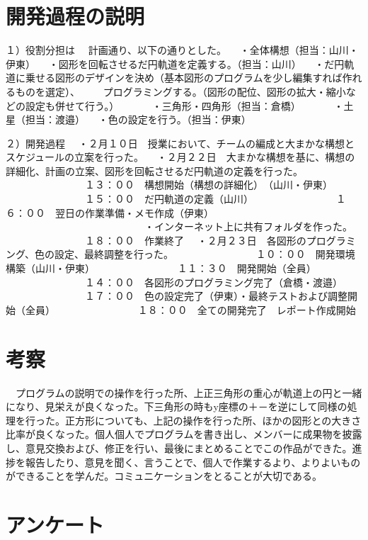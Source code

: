 \documentclass[12pt,a4j]{jarticle}
\begin{document}
\section{開発過程の説明}
\begin{itemize}
１）役割分担は
　計画通り、以下の通りとした。
　・全体構想（担当：山川・伊東）
　・図形を回転させるだ円軌道を定義する。（担当：山川）
　・だ円軌道に乗せる図形のデザインを決め（基本図形のプログラムを少し編集すれば作れるものを選定）、
　　プログラミングする。（図形の配位、図形の拡大・縮小などの設定も併せて行う。）
　　　・三角形・四角形（担当：倉橋）
　　　・土星（担当：渡邉）
　・色の設定を行う。（担当：伊東）

２）開発過程
　・２月１０日　授業において、チームの編成と大まかな構想とスケジュールの立案を行った。
　・２月２２日　大まかな構想を基に、構想の詳細化、計画の立案、図形を回転させるだ円軌道の定義を行った。
　　　　　　　　１３：００　構想開始（構想の詳細化）　（山川・伊東）
　　　　　　　　１５：００　だ円軌道の定義（山川）
　　　　　　　　１６：００　翌日の作業準備・メモ作成（伊東）
　　　　　　　　　　　　　　・インターネット上に共有フォルダを作った。
　　　　　　　　１８：００　作業終了
　・２月２３日　各図形のプログラミング、色の設定、最終調整を行った。
　　　　　　　　１０：００　開発環境構築（山川・伊東）
　　　　　　　　１１：３０　開発開始（全員）
　　　　　　　　１４：００　各図形のプログラミング完了（倉橋・渡邉）
　　　　　　　　１７：００　色の設定完了（伊東）・最終テストおよび調整開始（全員）
　　　　　　　　１８：００　全ての開発完了　レポート作成開始
\end{itemize}

\section{考察}

　プログラムの説明での操作を行った所、上正三角形の重心が軌道上の円と一緒になり、見栄えが良くなった。下三角形の時もy座標の＋－を逆にして同様の処理を行った。正方形についても、上記の操作を行った所、ほかの図形との大きさ比率が良くなった。個人個人でプログラムを書き出し、メンバーに成果物を披露し、意見交換および、修正を行い、最後にまとめることでこの作品ができた。進捗を報告したり、意見を聞く、言うことで、個人で作業するより、よりよいものができることを学んだ。コミュニケーションをとることが大切である。

\section{アンケート}
\end{document}

